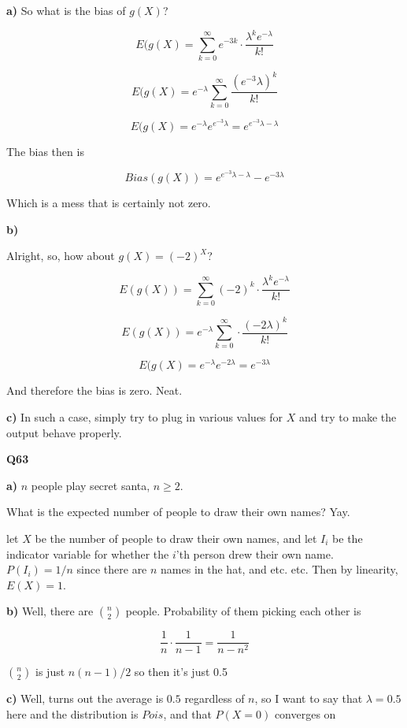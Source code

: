 \documentclass{article}
\begin{document}
		\textbf{a)} So what is the bias of $g(X)$?
		
		\[ E(g(X) = \sum^\infty_{k=0} e^{-3k}\cdot\frac{\lambda^ke^{-\lambda}}{k!} \]
		
		\[ E(g(X) = e^{-\lambda}\sum^\infty_{k=0} \frac{(e^{-3}\lambda)^k}{k!} \]
		
		\[ E(g(X) = e^{-\lambda}e^{e^{-3}\lambda} = e^{e^{-3}\lambda - \lambda} \]
		
		The bias then is
		
		\[ Bias(g(X)) = e^{e^{-3}\lambda - \lambda} - e^{-3\lambda} \]
		
		Which is a mess that is certainly not zero.
		
		
		\textbf{b)}
		
		Alright, so, how about $g(X) = (-2)^X$?
		
		\[ E(g(X)) = \sum^\infty_{k=0} (-2)^k\cdot\frac{\lambda^ke^{-\lambda}}{k!} \]
		
		\[ E(g(X)) = e^{-\lambda}\sum^\infty_{k=0} \cdot\frac{(-2\lambda)^k}{k!} \]
		
		\[ E(g(X) =  e^{-\lambda} e^{-2\lambda} = e^{-3\lambda}\]
		
		And therefore the bias is zero. Neat.
		
		\textbf{c)} In such a case, simply try to plug in various values for $X$ and try to make the output behave properly.
		
		\hfill
		
		\textbf{Q63}
		
		\textbf{a)} $n$ people play secret santa, $n \ge 2$. 
		
		What is the expected number of people to draw their own names? Yay.
		
		let $X$ be the number of people to draw their own names, and let $I_i$ be the indicator variable for whether the $i$'th person drew their own name. $P(I_i) = 1/n$ since there are $n$ names in the hat, and etc. etc. Then by linearity, $E(X) = 1$.
		
		\textbf{b)} Well, there are ${n\choose 2}$ people. Probability of them picking each other is
		
		\[\frac{1}{n}\cdot\frac{1}{n-1} = \frac{1}{n-n^2} \]
		
		${n\choose 2}$ is just $n(n-1)/2$ so then it's just 0.5
		
		\textbf{c)} Well, turns out the average is $0.5$ regardless of $n$, so I want to say that $\lambda = 0.5$ here and the distribution is $Pois$, and that $P(X=0)$ converges on 
		
\end{document}
